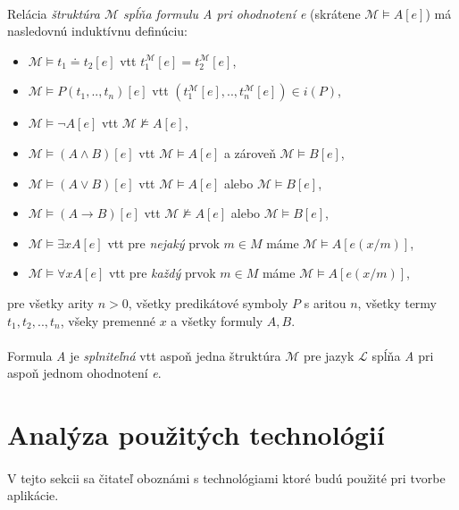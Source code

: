 \paragraph{}
Relácia \emph{štruktúra $\mathcal{M}$ spĺňa formulu A pri ohodnotení e} (skrátene $\mathcal{M} \models A[e]$) má nasledovnú induktívnu definúciu:
\begin{itemize}
	\item $\mathcal{M} \models t_1 \doteq t_2[e]$ vtt $t_1^\mathcal{M}[e] = t_2^\mathcal{M}[e]$,
	\item $\mathcal{M} \models P(t_1, .., t_n)[e]$ vtt $(t_1^\mathcal{M}[e], .., t_n^\mathcal{M}[e]) \in i(P)$,
	\item $\mathcal{M} \models \neg A[e]$ vtt $\mathcal{M} \not\models A[e]$,
	\item $\mathcal{M} \models (A \wedge B)[e]$ vtt $\mathcal{M} \models A[e]$ a zároveň $\mathcal{M} \models B[e]$,
	\item $\mathcal{M} \models (A \vee B)[e]$ vtt $\mathcal{M} \models A[e]$ alebo $\mathcal{M} \models B[e]$,
	\item $\mathcal{M} \models (A \to B)[e]$ vtt $\mathcal{M} \not\models A[e]$ alebo $\mathcal{M} \models B[e]$,
	\item $\mathcal{M} \models \exists xA[e]$ vtt pre \emph{nejaký} prvok $m \in M$ máme $\mathcal{M} \models A[e(x/m)]$,
	\item $\mathcal{M} \models \forall xA[e]$ vtt pre \emph{každý} prvok $m \in M$ máme $\mathcal{M} \models A[e(x/m)]$,
\end{itemize}
pre všetky arity $n > 0$, všetky predikátové symboly $P$ s aritou $n$, všetky termy $t_1, t_2, .., t_n$, všeky premenné $x$ a všetky formuly $A, B$.

\paragraph{}
Formula \emph{A} je \emph{splniteľná} vtt aspoň jedna štruktúra $\mathcal{M}$ pre jazyk $\mathcal{L}$ spĺňa \emph{A} pri aspoň jednom ohodnotení \emph{e}.





\section{Analýza použitých technológií}
\paragraph{}
V tejto sekcii sa čitateľ oboznámi s technológiami ktoré budú použité pri tvorbe aplikácie. 


